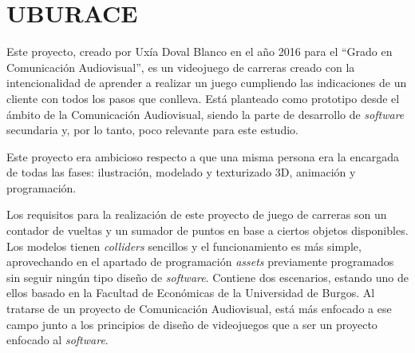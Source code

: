 \section{UBURACE}

Este proyecto, creado por Uxía Doval Blanco en el año 2016 para el ``Grado en Comunicación Audiovisual'', es un videojuego de carreras creado con la intencionalidad de aprender a realizar un juego cumpliendo las indicaciones de un cliente con todos los pasos que conlleva. Está planteado como prototipo desde el ámbito de la Comunicación Audiovisual, siendo la parte de desarrollo de \textit{software} secundaria y, por lo tanto, poco relevante para este estudio. 

Este proyecto era ambicioso respecto a que una misma persona era la encargada de todas las fases: ilustración, modelado y texturizado 3D, animación y programación. 

Los requisitos para la realización de este proyecto de juego de carreras son un contador de vueltas y un sumador de puntos en base a ciertos objetos disponibles. Los modelos tienen \textit{colliders} sencillos y el funcionamiento es más simple, aprovechando en el apartado de programación \textit{assets} previamente programados sin seguir ningún tipo diseño de \textit{software}. Contiene dos escenarios, estando uno de ellos basado en la Facultad de Económicas de la Universidad de Burgos. Al tratarse de un proyecto de Comunicación Audiovisual, está más enfocado a ese campo junto a los principios de diseño de videojuegos que a ser un proyecto enfocado al \textit{software}.

